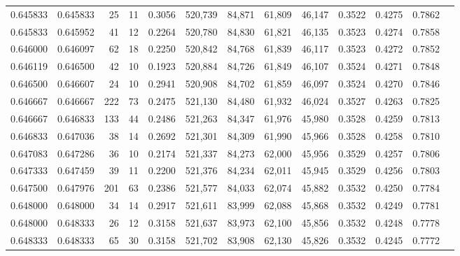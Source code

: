 \begin{tabular}{rrrrrrrrrrrrr}
0.645833 & 0.645833 &    25 &  11 &                                     0.3056 & 520,739 &  84,871 &  61,809 &  46,147 & 0.3522 & 0.4275 & 0.7862 \\
0.645833 & 0.645952 &    41 &  12 &                                     0.2264 & 520,780 &  84,830 &  61,821 &  46,135 & 0.3523 & 0.4274 & 0.7858 \\
0.646000 & 0.646097 &    62 &  18 &                                     0.2250 & 520,842 &  84,768 &  61,839 &  46,117 & 0.3523 & 0.4272 & 0.7852 \\
0.646119 & 0.646500 &    42 &  10 &                                     0.1923 & 520,884 &  84,726 &  61,849 &  46,107 & 0.3524 & 0.4271 & 0.7848 \\
0.646500 & 0.646607 &    24 &  10 &                                     0.2941 & 520,908 &  84,702 &  61,859 &  46,097 & 0.3524 & 0.4270 & 0.7846 \\
0.646667 & 0.646667 &   222 &  73 &                                     0.2475 & 521,130 &  84,480 &  61,932 &  46,024 & 0.3527 & 0.4263 & 0.7825 \\
0.646667 & 0.646833 &   133 &  44 &                                     0.2486 & 521,263 &  84,347 &  61,976 &  45,980 & 0.3528 & 0.4259 & 0.7813 \\
0.646833 & 0.647036 &    38 &  14 &                                     0.2692 & 521,301 &  84,309 &  61,990 &  45,966 & 0.3528 & 0.4258 & 0.7810 \\
0.647083 & 0.647286 &    36 &  10 &                                     0.2174 & 521,337 &  84,273 &  62,000 &  45,956 & 0.3529 & 0.4257 & 0.7806 \\
0.647333 & 0.647459 &    39 &  11 &                                     0.2200 & 521,376 &  84,234 &  62,011 &  45,945 & 0.3529 & 0.4256 & 0.7803 \\
0.647500 & 0.647976 &   201 &  63 &                                     0.2386 & 521,577 &  84,033 &  62,074 &  45,882 & 0.3532 & 0.4250 & 0.7784 \\
0.648000 & 0.648000 &    34 &  14 &                                     0.2917 & 521,611 &  83,999 &  62,088 &  45,868 & 0.3532 & 0.4249 & 0.7781 \\
0.648000 & 0.648333 &    26 &  12 &                                     0.3158 & 521,637 &  83,973 &  62,100 &  45,856 & 0.3532 & 0.4248 & 0.7778 \\
0.648333 & 0.648333 &    65 &  30 &                                     0.3158 & 521,702 &  83,908 &  62,130 &  45,826 & 0.3532 & 0.4245 & 0.7772 \\

\end{tabular}
